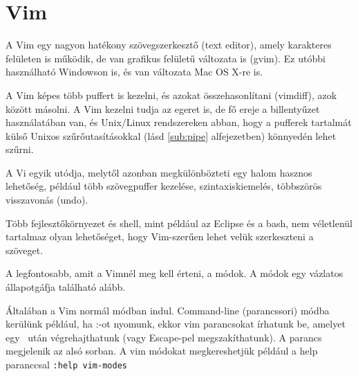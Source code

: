 \documentclass[a4paper]{article}
\newcommand{\Esc}{\framebox{\texttt{Esc}}}
\newcommand{\Enter}{\framebox{\texttt{Enter}}}
\begin{document}
\newpage
\section{Vim}

A Vim egy nagyon hatékony szövegszerkesztő (text editor), amely
karakteres felületen is működik, de van grafikus felületű változata is
(gvim). Ez utóbbi használható Windowson is, és van változata Mac OS X-re
is.

A Vim képes több puffert is kezelni, és azokat összehasonlítani
(vimdiff), azok között másolni. A Vim kezelni tudja az egeret is, de fő
ereje a billentyűzet használatában van, és Unix/Linux rendszereken
abban, hogy a pufferek tartalmát külső Unixos szűrőutasításokkal (lásd
\ref{sub:pipe} alfejezetben) könnyedén lehet szűrni.

A Vi egyik utódja, melytől azonban megkülönbözteti egy halom hasznos
lehetőség, például több szövegpuffer kezelése, szintaxiskiemelés,
többszörös visszavonás (undo).

Több fejlesztőkörnyezet és shell, mint például az Eclipse és a bash, nem
véletlenül tartalmaz olyan lehetőséget, hogy Vim-szerűen lehet velük
szerkeszteni a szöveget.

A legfontosabb, amit a Vimnél meg kell érteni, a módok. A módok egy
vázlatos állapotgáfja található alább.

\smallskip


Általában a Vim normál módban indul. Command-line (parancssori) módba
kerülünk például, ha :-ot nyomunk, ekkor vim parancsokat írhatunk be,
amelyet egy \Enter\ után végrehajthatunk (vagy Escape-pel
megszakíthatunk). A parancs megjelenik az alsó sorban. A vim módokat
megkereshetjük például a help paranccsal \verb!:help vim-modes!
\end{document}
